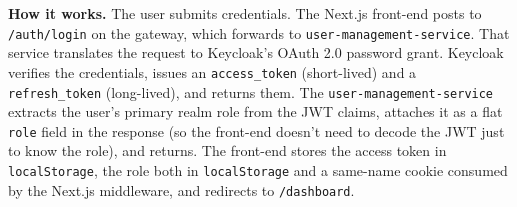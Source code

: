 \documentclass[12pt,a4paper,oneside]{report}
\begin{document}
\textbf{How it works.} The user submits credentials. The Next.js
front-end posts to \texttt{/auth/login} on the gateway, which
forwards to \texttt{user-management-service}. That service translates
the request to Keycloak's OAuth 2.0 password grant. Keycloak verifies
the credentials, issues an \texttt{access\_token} (short-lived) and a
\texttt{refresh\_token} (long-lived), and returns them. The
\texttt{user-management-service} extracts the user's primary realm
role from the JWT claims, attaches it as a flat \texttt{role} field
in the response (so the front-end doesn't need to decode the JWT
just to know the role), and returns. The front-end stores the
access token in \texttt{localStorage}, the role both in
\texttt{localStorage} and a same-name cookie consumed by the Next.js
middleware, and redirects to \texttt{/dashboard}.
\end{document}
